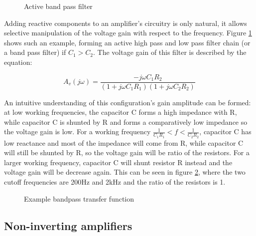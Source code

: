 \begin{figure}[H]
    \center
    
    \caption{Active band pass filter}
    \label{fig:invfilt}
\end{figure}

Adding reactive components to an amplifier's circuitry is only natural, it
allows selective manipulation of the voltage gain with respect to the
frequency. Figure \ref{fig:invfilt} shows such an example, forming an active
high pass and low pass filter chain (or a band pass filter) if $C_1 > C_2$.
The voltage gain of this filter is described by the equation:

\begin{equation}
    A_v(j\omega) =
        \frac{-j\omega C_1 R_2}{(1+j\omega C_1 R_1)(1+j\omega C_2 R_2)}
\end{equation}

An intuitive understanding of this configuration's gain amplitude can be
formed: at low working frequencies, the capacitor C forms a high
impedance with R, while capacitor C is shunted by R and
forms a comparatively low impedance so the voltage gain is low. For a working
frequency $\frac{1}{C_1R_1} < f < \frac{1}{C_2R_2}$, capacitor C has low
reactance and most of the impedance will come from R, while capacitor
C will still be shunted by R, so the voltage gain will be ratio
of the resistors. For a larger working frequency, capacitor C will shunt
resistor R instead and the voltage gain will be decrease again. This can
be seen in figure \ref{fig:bandpass}, where the two cutoff frequencies are
200Hz and 2kHz and the ratio of the resistors is 1.

\begin{figure}[H]
    \center
    \caption{Example bandpass transfer function}
    \label{fig:bandpass}
\end{figure}


\subsection{Non-inverting amplifiers}

